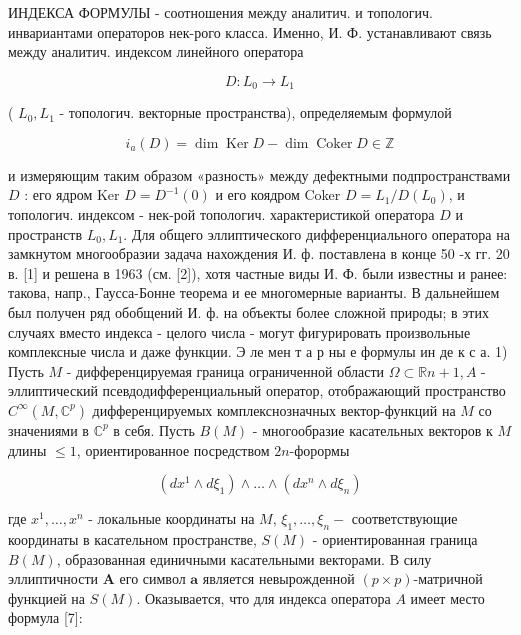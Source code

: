 \documentclass[10pt]{article}
\begin{document}
ИНДЕКСА ФОРМУЛЫ - соотношения между аналитич. и топологич. инвариантами операторов нек-рого класса. Именно, И. Ф. устанавливают связь между аналитич. индексом линейного оператора



\[

D: L_{0} \rightarrow L_{1}

\]



( $L_{0}, L_{1}$ - топологич. векторные пространства), определяемым формулой



\[

i_{a}(D)=\operatorname{dim} \operatorname{Ker} D-\operatorname{dim} \operatorname{Coker} D \in \mathbb{Z}

\]



и измеряющим таким образом «разность» между дефектными подпространствами $D$ : его ядром Ker $D=D^{-1}(0)$ и его коядром Coker $D=L_{1} / D\left(L_{0}\right)$, и топологич. индексом - нек-рой топологич. характеристикой оператора $D$ и пространств $L_{0}, L_{1}$. Для общего эллиптического дифференциального оператора на замкнутом многообразии задача нахождения И. ф. поставлена в конце 50 -х гг. 20 в. [1] и решена в 1963 (см. [2]), хотя частные виды И. Ф. были известны и ранее: такова, напр., Гаусса-Бонне теорема и ее многомерные варианты. В дальнейшем был получен ряд обобщений И. ф. на объекты более сложной природы; в этих случаях вместо индекса - целого числа - могут фигурировать произвольные комплексные числа и даже функции. Э ле мен т а р ны е формулы ин де к с а. 1) Пусть $M$ - дифференцируемая граница ограниченной области $\Omega \subset \mathbb{R} n+1, A$ - эллиптический псевдодифференциальный оператор, отображающий пространство $C^{\infty}\left(M, \mathbb{C}^{p}\right)$ дифференцируемых комплекснозначных вектор-функций на $M$ со значениями в $\mathbb{C}^{p}$ в себя. Пусть $B(M)$ - многообразие касательных векторов к $M$ длины $\leqslant 1$, ориентированное посредством $2 n$-форормы



\[

\left(d x^{1} \wedge d \xi_{1}\right) \wedge \ldots \wedge\left(d x^{n} \wedge d \xi_{n}\right)

\]



где $x^{1}, \ldots, x^{n}$ - локальные координаты на $M$, $\xi_{1}, \ldots, \xi_{n}-$ соответствующие координаты в касательном пространстве, $S(M)$ - ориентированная граница $B(M)$, образованная единичными касательными векторами. В силу эллиптичности $\boldsymbol{A}$ его символ $\boldsymbol{a}$ является невырожденной $(p \times p)$-матричной функцией на $S(M)$. Оказывается, что для индекса оператора $A$ имеет место формула [7]:
\end{document}
